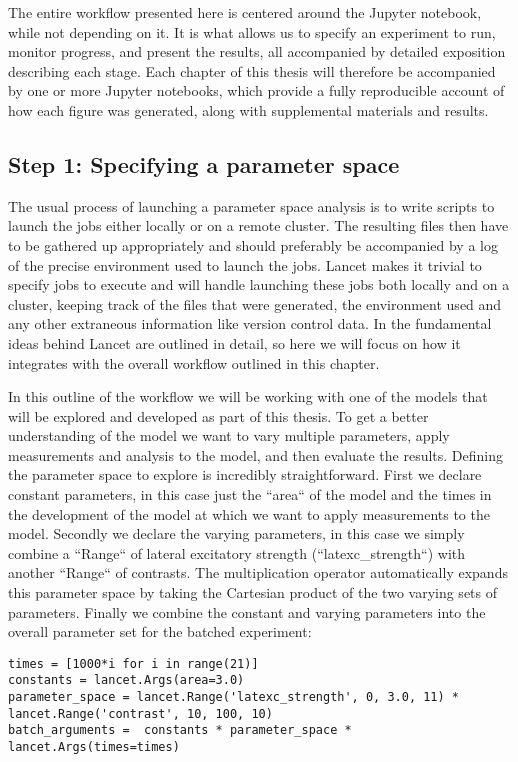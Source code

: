 The entire workflow presented here is centered around the Jupyter
notebook, while not depending on it. It is what allows us to specify
an experiment to run, monitor progress, and present the results, all
accompanied by detailed exposition describing each stage. Each chapter
of this thesis will therefore be accompanied by one or more Jupyter
notebooks, which provide a fully reproducible account of how each
figure was generated, along with supplemental materials and results.

\subsection{Step 1: Specifying a parameter space}

The usual process of launching a parameter space analysis is to write
scripts to launch the jobs either locally or on a remote cluster. The
resulting files then have to be gathered up appropriately and should
preferably be accompanied by a log of the precise environment used to
launch the jobs. Lancet makes it trivial to specify jobs to execute
and will handle launching these jobs both locally and on a cluster,
keeping track of the files that were generated, the environment used
and any other extraneous information like version control data. In
\cite{Stevens2013a} the fundamental ideas behind Lancet are outlined
in detail, so here we will focus on how it integrates with the overall
workflow outlined in this chapter.

In this outline of the workflow we will be working with one of the
models that will be explored and developed as part of this thesis. To
get a better understanding of the model we want to vary multiple
parameters, apply measurements and analysis to the model, and then
evaluate the results. Defining the parameter space to explore is
incredibly straightforward. First we declare constant parameters, in
this case just the ``area`` of the model and the times in the
development of the model at which we want to apply measurements to the
model. Secondly we declare the varying parameters, in this case we
simply combine a ``Range`` of lateral excitatory strength
(``latexc\_strength``) with another ``Range`` of contrasts. The
multiplication operator automatically expands this parameter space by
taking the Cartesian product of the two varying sets of
parameters. Finally we combine the constant and varying parameters
into the overall parameter set for the batched experiment:

\begin{minipage}{\linewidth}
\begin{lstlisting}
times = [1000*i for i in range(21)]
constants = lancet.Args(area=3.0)
parameter_space = lancet.Range('latexc_strength', 0, 3.0, 11) * lancet.Range('contrast', 10, 100, 10)
batch_arguments =  constants * parameter_space * lancet.Args(times=times)
\end{lstlisting}
\end{minipage}

